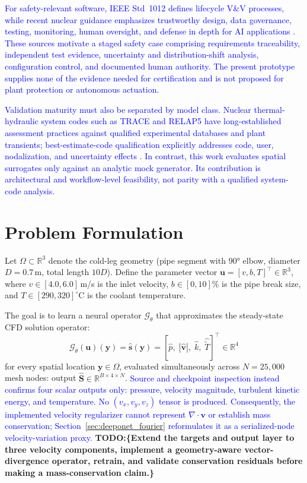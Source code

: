 \documentclass[journal]{IEEEtran}
\newcommand{\added}[1]{\textcolor{blue}{#1}}
\newcommand{\todo}[1]{\textcolor{green!50!black}{\textbf{TODO:\{#1\}}}}
\begin{document}
\added{For safety-relevant software, IEEE Std~1012 defines lifecycle V\&V processes, while recent nuclear guidance emphasizes trustworthy design, data governance, testing, monitoring, human oversight, and defense in depth for AI applications \cite{ieee1012,nrc7294,trilateral2024}. These sources motivate a staged safety case comprising requirements traceability, independent test evidence, uncertainty and distribution-shift analysis, configuration control, and documented human authority. The present prototype supplies none of the evidence needed for certification and is not proposed for plant protection or autonomous actuation.}

\added{Validation maturity must also be separated by model class. Nuclear thermal-hydraulic system codes such as TRACE and RELAP5 have long-established assessment practices against qualified experimental databases and plant transients; best-estimate-code qualification explicitly addresses code, user, nodalization, and uncertainty effects \cite{petruzzi2008,nrc_codes}. In contrast, this work evaluates spatial surrogates only against an analytic mock generator. Its contribution is architectural and workflow-level feasibility, not parity with a qualified system-code analysis.}

\section{Problem Formulation}
\label{sec:problem}

Let $\Omega \subset \mathbb{R}^3$ denote the cold-leg geometry (pipe segment with 90° elbow, diameter $D = 0.7$\,m, total length $10D$). Define the parameter vector $\bm{u} = [v, b, T]^\top \in \mathbb{R}^3$, where $v \in [4.0, 6.0]$\,m/s is the inlet velocity, $b \in [0, 10]$\% is the pipe break size, and $T \in [290, 320]^\circ$C is the coolant temperature.

The goal is to learn a neural operator $\mathcal{G}_\theta$ that approximates the steady-state CFD solution operator:
\begin{equation}
\mathcal{G}_\theta(\bm{u})(\bm{y}) = \hat{\bm{s}}(\bm{y}) = [\hat{p},\; |\hat{\bm{v}}|,\; \hat{k},\; \hat{\tilde{T}}]^\top \in \mathbb{R}^4
\label{eq:operator}
\end{equation}
for every spatial location $\bm{y} \in \Omega$, evaluated simultaneously across $N = 25{,}000$ mesh nodes: output $\hat{\bm{S}} \in \mathbb{R}^{B \times 4 \times N}$.  \added{Source and checkpoint inspection instead confirms four scalar outputs only: pressure, velocity magnitude, turbulent kinetic energy, and temperature. No $(v_x,v_y,v_z)$ tensor is produced. Consequently, the implemented velocity regularizer cannot represent $\nabla\!\cdot\!\bm v$ or establish mass conservation; Section~\ref{sec:deeponet_fourier} reformulates it as a serialized-node velocity-variation proxy.} \todo{Extend the targets and output layer to three velocity components, implement a geometry-aware vector-divergence operator, retrain, and validate conservation residuals before making a mass-conservation claim.}
\end{document}
